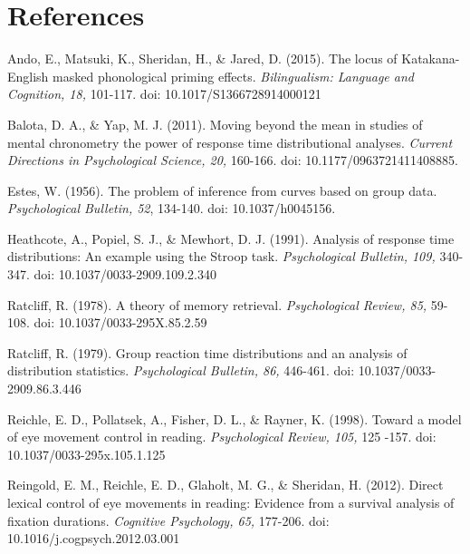 \documentclass[man]{apa}%
\begin{document}
\newpage

\section{References}

Ando, E., Matsuki, K., Sheridan, H., \& Jared, D. (2015). The locus of Katakana-English masked phonological priming effects. \emph{Bilingualism: Language and Cognition, 18,} 101-117. doi: 10.1017/S1366728914000121


Balota, D. A., \& Yap, M. J. (2011). Moving beyond the mean in studies of mental chronometry the power of response time distributional analyses. \emph{Current Directions in Psychological Science, 20,} 160-166. doi: 10.1177/0963721411408885.



Estes, W. (1956). The problem of inference from curves based on group data. \emph{Psychological Bulletin, 52}, 134-140. doi: 10.1037/h0045156.


Heathcote, A., Popiel, S. J., \& Mewhort, D. J. (1991). Analysis of response time distributions: An example using the Stroop task. \emph{Psychological Bulletin, 109,} 340-347. doi: 10.1037/0033-2909.109.2.340



Ratcliff, R. (1978). A theory of memory retrieval. \emph{Psychological Review, 85,} 59-108. doi: 10.1037/0033-295X.85.2.59 

Ratcliff, R. (1979). Group reaction time distributions and an analysis of distribution statistics. \emph{Psychological Bulletin, 86,} 446-461. doi: 10.1037/0033-2909.86.3.446

Reichle, E. D., Pollatsek, A., Fisher, D. L., \& Rayner, K. (1998). Toward a model of eye movement control in reading. \emph{Psychological Review, 105,} 125 -157. doi: 10.1037/0033-295x.105.1.125

Reingold, E. M., Reichle, E. D., Glaholt, M. G., \& Sheridan, H. (2012). Direct lexical control of eye movements in reading: Evidence from a survival analysis of fixation durations. \emph{Cognitive Psychology, 65,} 177-206. doi: 10.1016/j.cogpsych.2012.03.001 
\end{document}
